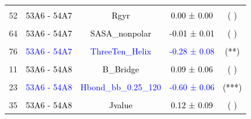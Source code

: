 \documentclass{article}\usepackage[table]{xcolor}
\renewcommand{\$}{$} %
\begin{document}
\begin{center}
\begin{longtable}[t]{lcccc}
\cellcolor{gray!6}{46} & \cellcolor{gray!6}{\textcolor{black}{53A6 - 54A7}} & \cellcolor{gray!6}{\textcolor{black}{Pi\_Helix}} & \cellcolor{gray!6}{\textcolor{black}{0.18 ± 0.11}} & \cellcolor{gray!6}{\textcolor{black}{( )}}\\
52 & \textcolor{black}{53A6 - 54A7} & \textcolor{black}{Rgyr} & \textcolor{black}{0.00 ± 0.00} & \textcolor{black}{( )}\\
\cellcolor{gray!6}{58} & \cellcolor{gray!6}{\textcolor{blue}{53A6 - 54A7}} & \cellcolor{gray!6}{\textcolor{blue}{RMSD.ADJ}} & \cellcolor{gray!6}{\textcolor{blue}{0.39 ± 0.08}} & \cellcolor{gray!6}{\textcolor{black}{(***)}}\\
64 & \textcolor{black}{53A6 - 54A7} & \textcolor{black}{SASA\_nonpolar} & \textcolor{black}{-0.01 ± 0.01} & \textcolor{black}{( )}\\
\cellcolor{gray!6}{70} & \cellcolor{gray!6}{\textcolor{black}{53A6 - 54A7}} & \cellcolor{gray!6}{\textcolor{black}{SASA\_polar}} & \cellcolor{gray!6}{\textcolor{black}{0.02 ± 0.02}} & \cellcolor{gray!6}{\textcolor{black}{( )}}\\
76 & \textcolor{blue}{53A6 - 54A7} & \textcolor{blue}{ThreeTen\_Helix} & \textcolor{blue}{-0.28 ± 0.08} & \textcolor{black}{(**)}\\
\cellcolor{gray!6}{5} & \cellcolor{gray!6}{\textcolor{blue}{53A6 - 54A8}} & \cellcolor{gray!6}{\textcolor{blue}{A\_Helix}} & \cellcolor{gray!6}{\textcolor{blue}{-0.43 ± 0.08}} & \cellcolor{gray!6}{\textcolor{black}{(***)}}\\
11 & \textcolor{black}{53A6 - 54A8} & \textcolor{black}{B\_Bridge} & \textcolor{black}{0.09 ± 0.06} & \textcolor{black}{( )}\\
\cellcolor{gray!6}{17} & \cellcolor{gray!6}{\textcolor{blue}{53A6 - 54A8}} & \cellcolor{gray!6}{\textcolor{blue}{B\_Strand}} & \cellcolor{gray!6}{\textcolor{blue}{0.58 ± 0.08}} & \cellcolor{gray!6}{\textcolor{black}{(***)}}\\
23 & \textcolor{blue}{53A6 - 54A8} & \textcolor{blue}{Hbond\_bb\_0.25\_120} & \textcolor{blue}{-0.60 ± 0.06} & \textcolor{black}{(***)}\\
\cellcolor{gray!6}{29} & \cellcolor{gray!6}{\textcolor{blue}{53A6 - 54A8}} & \cellcolor{gray!6}{\textcolor{blue}{Hbond\_native\_bb\_0.25\_120}} & \cellcolor{gray!6}{\textcolor{blue}{-0.59 ± 0.08}} & \cellcolor{gray!6}{\textcolor{black}{(***)}}\\
35 & \textcolor{black}{53A6 - 54A8} & \textcolor{black}{Jvalue} & \textcolor{black}{0.12 ± 0.09} & \textcolor{black}{( )}\\

\end{longtable}
\end{center}
\end{document}
